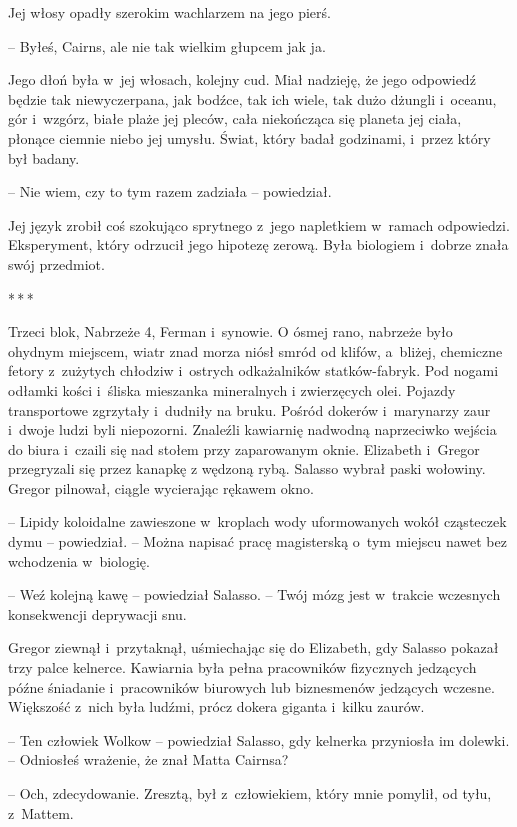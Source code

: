 \documentclass[oneside,polish,12pt,sfheadings]{mwbk}
\newcommand{\threeast}{\bigskip\par\centerline{*\,*\,*}\medskip\par}%
\begin{document}
Jej włosy opadły szerokim wachlarzem na jego pierś.

-- Byłeś, Cairns, ale nie tak wielkim głupcem jak ja.

Jego dłoń była w~jej włosach, kolejny cud. Miał nadzieję, że jego
odpowiedź będzie tak niewyczerpana, jak bodźce, tak ich wiele, tak dużo
dżungli i~oceanu, gór i~wzgórz, białe plaże jej pleców, cała niekończąca
się planeta jej ciała, płonące ciemnie niebo jej umysłu. Świat, który
badał godzinami, i~przez który był badany.

-- Nie wiem, czy to tym razem zadziała -- powiedział.

Jej język zrobił coś szokująco sprytnego z~jego napletkiem w~ramach
odpowiedzi. Eksperyment, który odrzucił jego hipotezę zerową. Była
biologiem i~dobrze znała swój przedmiot.

\threeast

Trzeci blok, Nabrzeże 4, Ferman i~synowie. O ósmej rano, nabrzeże było
ohydnym miejscem, wiatr znad morza niósł smród od klifów, a~bliżej,
chemiczne fetory z~zużytych chłodziw i~ostrych odkażalników
statków-fabryk. Pod nogami odłamki kości i~śliska mieszanka mineralnych
i zwierzęcych olei. Pojazdy transportowe zgrzytały i~dudniły na bruku.
Pośród dokerów i~marynarzy zaur i~dwoje ludzi byli niepozorni. Znaleźli
kawiarnię nadwodną naprzeciwko wejścia do biura i~czaili się nad stołem
przy zaparowanym oknie. Elizabeth i~Gregor przegryzali się przez kanapkę
z wędzoną rybą. Salasso wybrał paski wołowiny. Gregor pilnował, ciągle
wycierając rękawem okno.

-- Lipidy koloidalne zawieszone w~kroplach wody uformowanych wokół
cząsteczek dymu -- powiedział. -- Można napisać pracę magisterską o~tym
miejscu nawet bez wchodzenia w~biologię.

-- Weź kolejną kawę -- powiedział Salasso. -- Twój mózg jest w~trakcie
wczesnych konsekwencji deprywacji snu.

Gregor ziewnął i~przytaknął, uśmiechając się do Elizabeth, gdy Salasso
pokazał trzy palce kelnerce. Kawiarnia była pełna pracowników fizycznych
jedzących późne śniadanie i~pracowników biurowych lub biznesmenów
jedzących wczesne. Większość z~nich była ludźmi, prócz dokera giganta i~kilku zaurów.

-- Ten człowiek Wolkow -- powiedział Salasso, gdy kelnerka przyniosła im
dolewki. -- Odniosłeś wrażenie, że znał Matta Cairnsa?

-- Och, zdecydowanie. Zresztą, był z~człowiekiem, który mnie pomylił, od
tyłu, z~Mattem.
\end{document}
